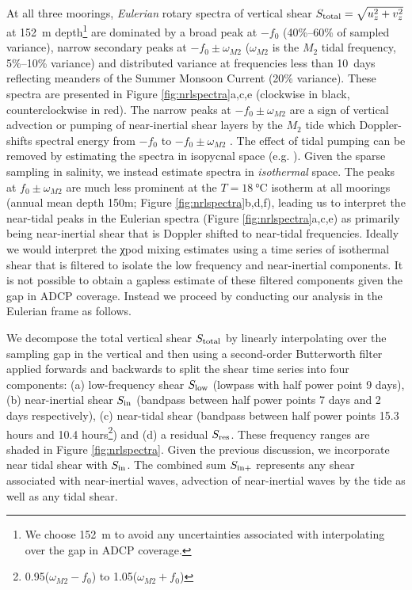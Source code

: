 \documentclass[onecol]{ametsoc}
\begin{document}
At all three moorings, \emph{Eulerian} rotary spectra of vertical shear \(S_\text{total} = \sqrt{u_z^2 + v_z^2}\) at \SI{152}{m} depth\footnote{We choose \SI{152}{m} to avoid any uncertainties associated with interpolating over the gap in ADCP coverage.} are dominated by a broad peak at \(-f_0\) (40\%--60\% of sampled variance), narrow secondary peaks at \(-f_0 \pm ω_{M2}\) (\(ω_{M2}\) is the \(M_2\) tidal frequency, 5\%--10\% variance) and distributed variance at frequencies less than \SI{10}{days} reflecting meanders of the Summer Monsoon Current (20\% variance).
These spectra are presented in Figure \ref{fig:nrlspectra}a,c,e (clockwise in black, counterclockwise in red).
The narrow peaks at \(-f_0 \pm ω_{M2}\) are a sign of vertical advection or pumping of near-inertial shear layers by the \(M_2\) tide which Doppler-shifts spectral energy from \(-f_0\) to \(-f_0 \pm ω_{M2}\) \citep{Alford2001a}.
The effect of tidal pumping can be removed by estimating the spectra in isopycnal space (e.g. \citealp{Alford2017}).
Given the sparse sampling in salinity, we instead estimate spectra in \emph{isothermal} space.
The peaks at \(f_0 \pm ω_{M2}\) are much less prominent at the $T=\SI{18}{\celsius}$ isotherm at all moorings (annual mean depth 150m; Figure \ref{fig:nrlspectra}b,d,f), leading us to interpret the near-tidal peaks in the Eulerian spectra (Figure \ref{fig:nrlspectra}a,c,e) as primarily being near-inertial shear that is Doppler shifted to near-tidal frequencies.
Ideally we would interpret the χpod mixing estimates using a time series of isothermal shear that is filtered to isolate the low frequency and near-inertial components.
It is not possible to obtain a gapless estimate of these filtered components given the gap in ADCP coverage.
Instead we proceed by conducting our analysis in the Eulerian frame as follows.

We decompose the total vertical shear \(S_\text{total}\) by linearly interpolating over the sampling gap in the vertical and then using a second-order Butterworth filter applied forwards and backwards to split the shear time series into four components: (a) low-frequency shear \(S_\text{low}\) (lowpass with half power point 9 days), (b) near-inertial shear  \(S_\text{in}\) (bandpass between half power points 7 days and 2 days respectively), (c) near-tidal shear (bandpass between half power points 15.3 hours and 10.4 hours\footnote{0.95(\(ω_{M2} - f_0\)) to 1.05(\(ω_{M2} + f_0\))}) and (d) a residual \(S_\text{res}\).
These frequency ranges are shaded in Figure \ref{fig:nrlspectra}.
Given the previous discussion, we incorporate near tidal shear with \(S_\text{in}\).
The combined sum \(S_\text{in+}\) represents any shear associated with near-inertial waves, advection of near-inertial waves by the tide as well as any tidal shear.
\end{document}
